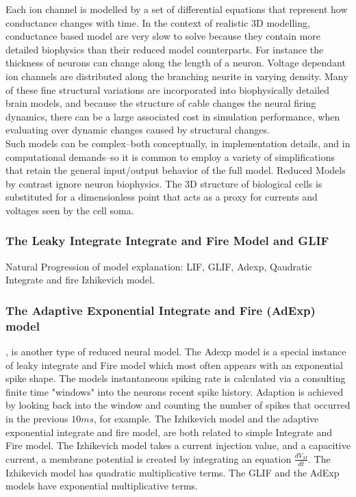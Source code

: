 Each ion channel is modelled by a set of differential equations that represent how conductance changes with time. In the context of realistic 3D modelling, conductance based model are very slow to solve because they contain more detailed biophysics than their reduced model counterparts. For instance the thickness of neurons can change along the length of a neuron. Voltage dependant ion channels are distributed along the branching neurite in varying density. Many of these fine structural variations are incorporated into biophysically detailed brain models, and because the structure of cable changes the neural firing dynamics, there can be a large associated cost in simulation performance, when evaluating over dynamic changes caused by structural changes.\\
Such models can be complex--both conceptually, in implementation details, and in computational demands--so it is common to employ a variety of simplifications that retain the general input/output behavior of the full model. Reduced Models by contrast ignore neuron biophysics. The 3D structure of biological cells is substituted for a dimensionless point that acts as a proxy for currents and voltages seen by the cell soma. 

\subsubsection{The Leaky Integrate Integrate and Fire Model and GLIF}
Natural Progression of model explanation: LIF, GLIF, Adexp, Qaudratic Integrate and fire Izhikevich model. %
\subsubsection{The Adaptive Exponential Integrate and Fire (AdExp) model} \cite{brette2005adaptive}, is another type of reduced neural model. The Adexp model is a special instance of leaky integrate and Fire model which most often appears with an exponential spike shape. The models instantaneous spiking rate is calculated via a consulting finite time "windows" into the neurons recent spike history. Adaption is achieved by looking back into the window and counting the number of spikes that occurred in the previous $10ms$, for example. 
The Izhikevich model and the adaptive exponential integrate and fire model, are both related to simple Integrate and Fire model. The Izhikevich model takes a current injection value, and a capacitive current, a membrane potential is created by integrating an equation $\frac{d V_{M}}{dt}$. The Izhikevich model has quadratic multiplicative terms. The GLIF and the AdExp models have exponential multiplicative terms.


